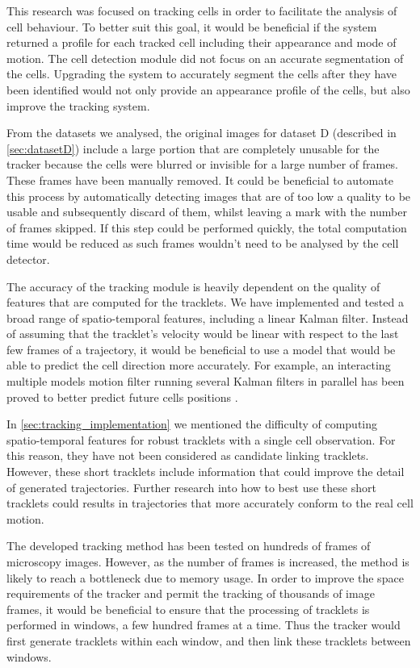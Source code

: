 This research was focused on tracking cells in order to facilitate the analysis of cell behaviour. To better suit this goal, it would be beneficial if the system returned a profile for each tracked cell including their appearance and mode of motion. The cell detection module did not focus on an accurate segmentation of the cells. Upgrading the system to accurately segment the cells after they have been identified would not only provide an appearance profile of the cells, but also improve the tracking system. 

From the datasets we analysed, the original images for dataset D (described in \cref{sec:datasetD}) include a large portion that are completely unusable for the tracker because the cells were blurred or invisible for a large number of frames. These frames have been manually removed. It could be beneficial to automate this process by automatically detecting images that are of too low a quality to be usable and subsequently discard of them, whilst leaving a mark with the number of frames skipped. If this step could be performed quickly, the total computation time would be reduced as such frames wouldn't need to be analysed by the cell detector.

The accuracy of the tracking module is heavily dependent on the quality of features that are computed for the tracklets. We have implemented and tested a broad range of spatio-temporal features, including a linear Kalman filter. Instead of assuming that the tracklet's velocity would be linear with respect to the last few frames of a trajectory, it would be beneficial to use a model that would be able to predict the cell direction more accurately. For example, an interacting multiple models motion filter running several Kalman filters in parallel has been proved to better predict future cells positions \cite{li08}.

In \cref{sec:tracking_implementation} we mentioned the difficulty of computing spatio-temporal features for robust tracklets with a single cell observation. For this reason, they have not been considered as candidate linking tracklets. However, these short tracklets include information that could improve the detail of generated trajectories. Further research into how to best use these short tracklets could results in trajectories that more accurately conform to the real cell motion.

The developed tracking method has been tested on hundreds of frames of microscopy images. However, as the number of frames is increased, the method is likely to reach a bottleneck due to memory usage. In order to improve the space requirements of the tracker and permit the tracking of thousands of image frames, it would be beneficial to ensure that the processing of tracklets is performed in windows, a few hundred frames at a time. Thus the tracker would first generate tracklets within each window, and then link these tracklets between windows. 

